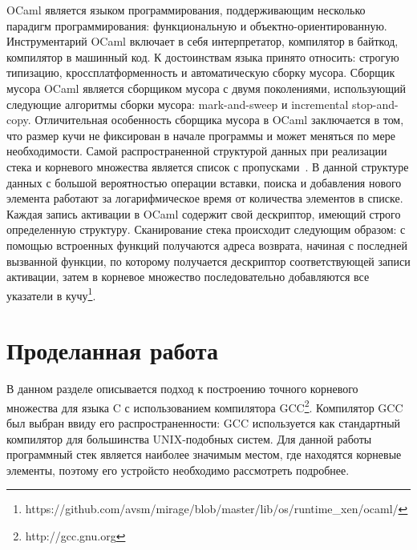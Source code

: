 OCaml является языком программирования, поддерживающим несколько парадигм программирования: функциональную и
объектно-ориентированную. Инструментарий OCaml включает в себя интерпретатор, компилятор в байткод, компилятор в
машинный код. К достоинствам языка принято относить: строгую типизацию, кроссплатформенность и автоматическую
сборку мусора. Сборщик мусора OCaml является сборщиком мусора с двумя поколениями, использующий следующие
алгоритмы сборки мусора: mark-and-sweep и incremental stop-and-copy. Отличительная особенность сборщика мусора
в OCaml заключается в том, что размер кучи не фиксирован в начале программы и может меняться по мере необходимости.
Самой распространенной структурой данных при реализации стека и корневого множества является список с пропусками~\cite{ref4}.
В данной структуре данных с большой вероятностью операции вставки, поиска и добавления нового элемента работают за логарифмическое время от количества элементов в списке. Каждая запись активации в OCaml содержит свой дескриптор, имеющий строго определенную структуру. Сканирование стека происходит следующим образом: с помощью встроенных функций получаются адреса возврата, начиная с последней вызванной функции, по которому получается дескриптор соответствующей записи активации, затем в корневое множество последовательно добавляются все указатели в кучу\footnote{https://github.com/avsm/mirage/blob/master/lib/os/runtime\_xen/ocaml/}.


\section{Проделанная работа}
В данном разделе описывается подход к построению точного корневого множества для языка C с использованием компилятора GCC\footnote{http://gcc.gnu.org}. Компилятор GCC был выбран ввиду его распространенности: GCC используется как стандартный компилятор для большинства UNIX-подобных систем. Для данной работы программный стек является наиболее значимым местом, где находятся корневые элементы, поэтому его устройсто необходимо рассмотреть подробнее.\\

